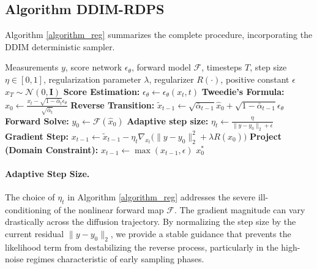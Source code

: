 \documentclass[a4paper,11pt]{article}
\renewcommand{\varepsilon}{\epsilon}
\theoremstyle{definition}
\theoremstyle{plain}
\theoremstyle{remark}
\begin{document}
\subsection{Algorithm DDIM-RDPS}

Algorithm \ref{algorithm_reg} summarizes the complete procedure, incorporating the DDIM deterministic sampler. 

\begin{algorithm}[h]
    \caption{DDIM-RDPS (Regularized Diffusion Posterior Sampling)}
    \begin{algorithmic}[1] 
        \Require Measurements $y$, score network $\varepsilon_\theta$, forward model $\mathcal{F}$, timesteps $T$, step size $\eta \in [0,1]$, regularization parameter $\lambda$, regularizer $R(\cdot)$, positive constant $\epsilon$
        \State $x_T \sim \mathcal{N}(0, \mathbf{I})$
        \State \textbf{Score Estimation:} $\varepsilon_{\theta} \leftarrow \varepsilon_\theta(x_t, t)$
        \State \textbf{Tweedie's Formula:} $\hat{x}_{0} \leftarrow \frac{x_{t}-\sqrt{1-\bar{\alpha}_t}\varepsilon_{\theta}}{\sqrt{\bar{\alpha}_t}}$
        \State \textbf{Reverse Transition:} $\tilde{x}_{t-1} \leftarrow \sqrt{\bar{\alpha}_{t-1}}\hat{x}_{0} + \sqrt{1-\bar{\alpha}_{t-1}} \varepsilon_{\theta}$
        \State \textbf{Forward Solve:} \quad $y_0 \leftarrow \mathcal{F}(\hat{x}_{0})$
        \State \textbf{Adaptive step size:} $\eta_t \leftarrow \frac{\eta}{\|y - y_0\|_2 + \epsilon}$
        \State \textbf{Gradient Step:} \quad $x_{t-1} \leftarrow \tilde{x}_{t-1} - \eta_t \nabla_{x_t} \big( \|y - y_0\|_2^2 + \lambda R(\hat{x}_0) \big)$
        \State \textbf{Project (Domain Constraint):} $x_{t-1} \leftarrow \max(x_{t-1}, \epsilon)$
        \EndFor
        \State \Return $x_0^*$
    \end{algorithmic}
\label{algorithm_reg}
\end{algorithm}

\paragraph{Adaptive Step Size.} The choice of $\eta_t$ in Algorithm \ref{algorithm_reg} addresses the severe ill-conditioning of the nonlinear forward map $\mathcal{F}$. The gradient magnitude can vary drastically across the diffusion trajectory. By normalizing the step size by the current residual $\|y - y_0\|_2$, we provide a stable guidance that prevents the likelihood term from destabilizing the reverse process, particularly in the high-noise regimes characteristic of early sampling phases.
\end{document}
